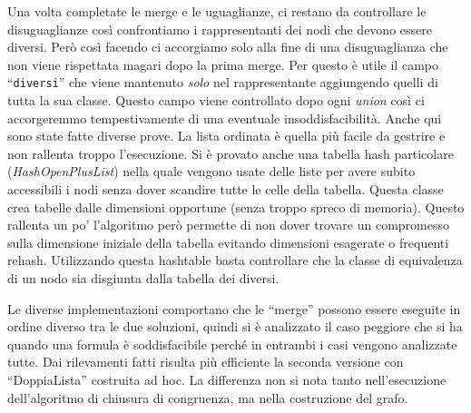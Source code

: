\documentclass[a4paper,11pt]{article} %
\newcommand{\campo}{\texttt}
\begin{document}
Una volta completate le merge e le uguaglianze, ci restano da controllare le disuguaglianze
cos\`i confrontiamo i rappresentanti dei nodi che devono essere
diversi. 
Per\`o cos\`i facendo ci accorgiamo solo alla fine di una disuguaglianza che 
non viene rispettata magari dopo la prima merge. Per questo %
\`e utile il campo ``\campo{diversi}'' che viene 
mantenuto %
\emph{solo} nel rappresentante aggiungendo %
quelli
di tutta la sua classe.
Questo campo viene controllato dopo ogni \emph{union}
cos\`i ci accorgeremmo tempestivamente di una eventuale insoddisfacibilit\`a.
Anche qui sono state fatte diverse prove. La lista ordinata \`e quella pi\`u
facile da gestrire e non rallenta troppo l'esecuzione. Si \`e provato anche una tabella
hash particolare (\emph{HashOpenPlusList}) nella quale vengono usate delle liste
per avere subito accessibili i nodi senza dover scandire tutte le celle della tabella.
Questa classe crea tabelle
dalle dimensioni opportune (senza troppo spreco di memoria). 
Questo %
rallenta un po' l'algoritmo per\`o permette di non dover trovare un compromesso
sulla dimensione iniziale della tabella evitando dimensioni %
esagerate %
o frequenti rehash. 
Utilizzando questa hashtable
basta controllare che la classe di equivalenza di un nodo sia disgiunta dalla
tabella dei diversi.

Le diverse implementazioni comportano che le ``merge'' 
possono essere eseguite in ordine diverso
tra le due soluzioni, quindi si \`e analizzato il caso peggiore %
che si ha quando una formula \`e soddisfacibile perch\'e in entrambi i casi vengono
analizzate tutte.
Dai rilevamenti fatti risulta pi\`u efficiente la seconda versione con ``DoppiaLista'' costruita ad hoc.
La differenza non si nota tanto nell'esecuzione dell'algoritmo di chiusura di congruenza,
ma nella costruzione del grafo.
 

\end{document}
